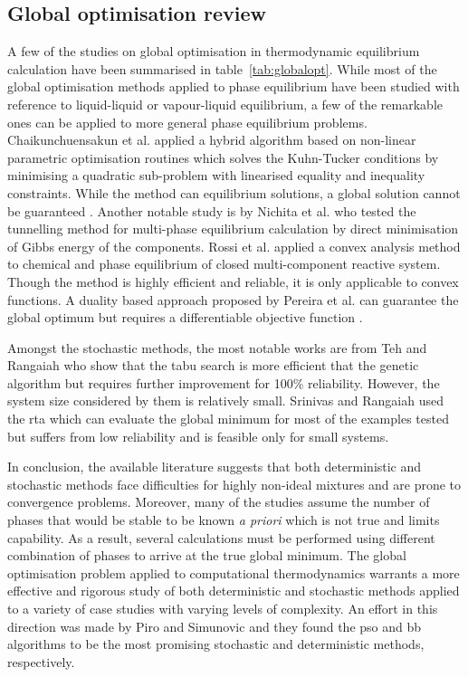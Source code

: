 	\subsection{Global optimisation review}
	 A few of the studies on global optimisation in thermodynamic equilibrium calculation have been summarised in table~\ref{tab:globalopt}. While most of the global optimisation methods applied to phase equilibrium have been studied with reference to liquid-liquid or vapour-liquid equilibrium, a few of the remarkable ones can be applied to more general phase equilibrium problems. Chaikunchuensakun et al. \cite{Chaikunchuensakun:2002aa} applied a hybrid algorithm based on non-linear parametric optimisation routines which solves the Kuhn-Tucker conditions by minimising a quadratic sub-problem with linearised equality and inequality constraints. While the method can equilibrium solutions, a global solution cannot be guaranteed \cite{Zhang11}. Another notable study is by Nichita et al. \cite{Nichita02} who tested the tunnelling method for multi-phase equilibrium calculation by direct minimisation of Gibbs energy of the components. Rossi et al. \cite{ROSSI20111226} applied a convex analysis method to chemical and phase equilibrium of closed multi-component reactive system. Though the method is highly efficient and reliable, it is only applicable to convex functions. A duality based approach proposed by Pereira et al. \cite{PEREIRA20101} can guarantee the global optimum but requires a differentiable objective function \cite{Zhang11}.

	 Amongst the stochastic methods, the most notable works are from Teh and Rangaiah \cite{Teh03} who show that the tabu search is more efficient that the genetic algorithm but requires further improvement for 100\% reliability. However, the system size considered by them is relatively small. Srinivas and Rangaiah \cite{Srinivas06} used the \gls{rta} which can evaluate the global minimum for most of the examples tested but suffers from low reliability and is feasible only for small systems.

	 In conclusion, the available literature suggests that both deterministic and stochastic methods face difficulties for highly non-ideal mixtures and are prone to convergence problems. Moreover, many of the studies assume the number of phases that would be stable to be known \textit{a priori} which is not true and limits capability. As a result, several calculations must be performed using different combination of phases to arrive at the true global minimum. The global optimisation problem applied to computational thermodynamics warrants a more effective and rigorous study of both deterministic and stochastic methods applied to a variety of case studies with varying levels of complexity. An effort in this direction was made by Piro and Simunovic \cite{Piro16} and they found the \gls{pso} and \gls{bb} algorithms to be the most promising stochastic and deterministic methods, respectively.

